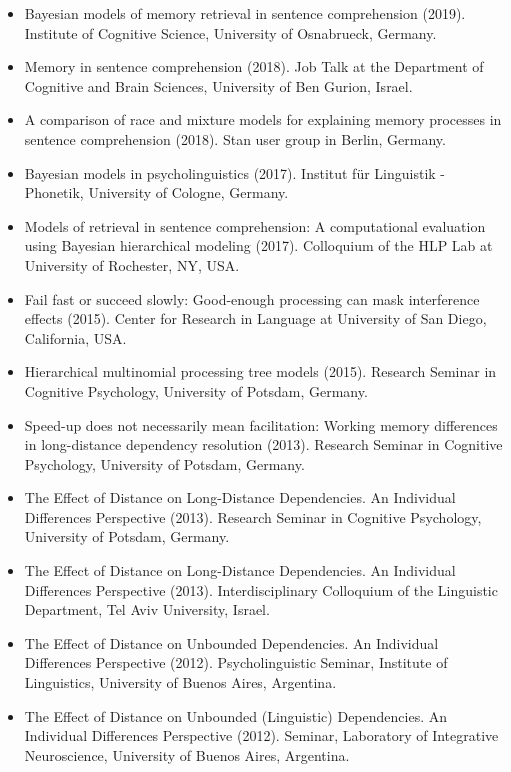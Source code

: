 \documentclass[]{article}
\begin{document}
\begin{itemize}
\item
  Bayesian models of memory retrieval in sentence comprehension (2019).
  Institute of Cognitive Science, University of Osnabrueck, Germany.
\item
  Memory in sentence comprehension (2018). Job Talk at the Department of
  Cognitive and Brain Sciences, University of Ben Gurion, Israel.
\item
  A comparison of race and mixture models for explaining memory
  processes in sentence comprehension (2018). Stan user group in Berlin,
  Germany.
\item
  Bayesian models in psycholinguistics (2017). Institut für Linguistik -
  Phonetik, University of Cologne, Germany.
\item
  Models of retrieval in sentence comprehension: A computational
  evaluation using Bayesian hierarchical modeling (2017). Colloquium of
  the HLP Lab at University of Rochester, NY, USA.
\item
  Fail fast or succeed slowly: Good-enough processing can mask
  interference effects (2015). Center for Research in Language at
  University of San Diego, California, USA.
\item
  Hierarchical multinomial processing tree models (2015). Research
  Seminar in Cognitive Psychology, University of Potsdam, Germany.
\item
  Speed-up does not necessarily mean facilitation: Working memory
  differences in long-distance dependency resolution (2013). Research
  Seminar in Cognitive Psychology, University of Potsdam, Germany.
\item
  The Effect of Distance on Long-Distance Dependencies. An Individual
  Differences Perspective (2013). Research Seminar in Cognitive
  Psychology, University of Potsdam, Germany.
\item
  The Effect of Distance on Long-Distance Dependencies. An Individual
  Differences Perspective (2013). Interdisciplinary Colloquium of the
  Linguistic Department, Tel Aviv University, Israel.
\item
  The Effect of Distance on Unbounded Dependencies. An Individual
  Differences Perspective (2012). Psycholinguistic Seminar, Institute of
  Linguistics, University of Buenos Aires, Argentina.
\item
  The Effect of Distance on Unbounded (Linguistic) Dependencies. An
  Individual Differences Perspective (2012). Seminar, Laboratory of
  Integrative Neuroscience, University of Buenos Aires, Argentina.

   
\end{itemize}
\end{document}
